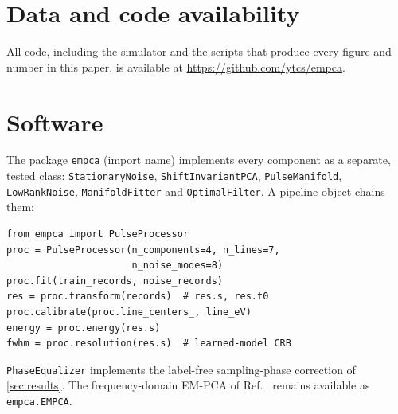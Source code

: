 \documentclass[aps,prapplied,reprint,superscriptaddress,longbibliography,nofootinbib]{revtex4-2}
\theoremstyle{remark}
\begin{document}
\section*{Data and code availability}
All code, including the simulator and the scripts that produce every figure and
number in this paper, is available at \url{https://github.com/ytcs/empca}.

\appendix
\section{Software}
\label{app:software}
The package \texttt{empca} (import name) implements every component as a
separate, tested class: \texttt{StationaryNoise}, \texttt{ShiftInvariantPCA},
\texttt{PulseManifold}, \texttt{LowRankNoise}, \texttt{ManifoldFitter} and
\texttt{OptimalFilter}. A pipeline object chains them:
{\footnotesize
\begin{verbatim}
from empca import PulseProcessor
proc = PulseProcessor(n_components=4, n_lines=7,
                      n_noise_modes=8)
proc.fit(train_records, noise_records)
res = proc.transform(records)  # res.s, res.t0
proc.calibrate(proc.line_centers_, line_eV)
energy = proc.energy(res.s)
fwhm = proc.resolution(res.s)  # learned-model CRB
\end{verbatim}}
\texttt{PhaseEqualizer} implements the label-free sampling-phase correction of
\cref{sec:results}. The frequency-domain EM-PCA of Ref.~\cite{Yu2019} remains
available as \texttt{empca.EMPCA}.



\end{document}
